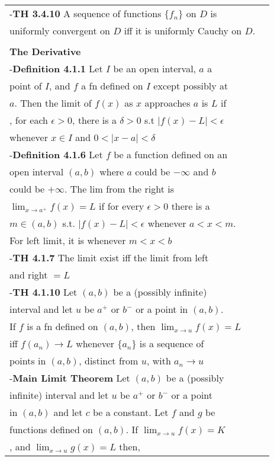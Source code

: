 \documentclass[10 pt,landscape]{article}
\begin{document}
\begin{multicols}{4}
\begin{tabular}{@{}ll@{}}
\end{tabular}

\begin{tabular}{@{}ll@{}}
-\textbf{TH 3.4.10} A sequence of functions $\{f_n\}$ on $D$ is \\ uniformly convergent on $D$ iff it is uniformly Cauchy on $D$.\\

\\
\textbf{The Derivative}\\
-\textbf{Definition 4.1.1} Let $I$ be an open interval, $a$ a \\point of $I$, and $f$ a fn defined on $I$ except possibly at \\$a$. Then the limit of $f(x)$ as $x$ approaches $a$ is $L$ if\\, for each $\epsilon >0$, there is a $\delta > 0$ s.t $|f(x)-L| < \epsilon$ \\whenever $x \in I$ and $0<|x-a|<\delta$\\
-\textbf{Definition 4.1.6} Let $f$ be a function defined on an \\open interval $(a,b)$ where $a$ could be $-\infty$ and $b$ \\could be $+\infty$. The lim from the right is\\ $\lim_{x \to a^{+}} f(x)=L$ if for every $\epsilon >0 $ there is a \\ $m \in (a,b)$ s.t. $|f(x)-L|<\epsilon $ whenever $a<x<m$. \\
For left limit, it is whenever $m<x<b$\\
-\textbf{TH 4.1.7} The limit exist iff the limit from left \\and right $=L$\\
-\textbf{TH 4.1.10} Let $(a,b)$ be a (possibly infinite) \\interval
and let $u$ be $a^{+}$ or $b^{-}$ or a point in $(a,b)$. \\If $f$ is a fn
defined on $(a,b)$, then $\lim_{x \to u} f(x)=L$\\ iff  $f(a_n) \to L$ whenever $\{a_n\}$ is a sequence of \\points in $(a,b)$, distinct from $u$, with $a_n \to u$\\
-\textbf{Main Limit Theorem} Let $(a,b)$ be a (possibly \\ infinite) interval and let $u$ be $a^{+}$ or $b^{-}$ or a point \\in $(a,b)$ and let $c$ be a constant. Let $f$ and $g$ be \\ functions defined on $(a,b)$. If $\lim_{x \to u} f(x)=K$ \\, and $\lim_{x \to u} g(x)=L$ then,\\

\end{tabular}
\end{multicols}
\end{document}
